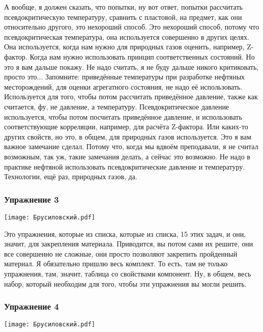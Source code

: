 \documentclass[main.tex]{subfiles}
\begin{document}
А вообще, я должен сказать, что попытки, ну вот ответ, попытки рассчитать псевдокритическую температуру, сравнить с пластовой, на предмет, как они относительно другого, это нехороший способ.
Это нехороший способ, потому что псевдокритическая температура, она используется совершенно в других целях.
Она используется, когда нам нужно для природных газов оценить, например, Z-фактор.
Когда нам нужно использовать принцип соответственных состояний.
Но это я вам дальше покажу.
Не надо считать, я не буду дальше никого критиковать, просто это...
Запомните: приведённые температуры при разработке нефтяных месторождений, для оценки агрегатного состояния, не надо её использовать.
Используется для того, чтобы потом рассчитать приведённое давление, также как считается, фу, не давление, а температуру.
Псевдокритическое давление используется, чтобы потом посчитать приведённое давление, и использовать соответствующие корреляции, например, для расчёта Z-фактора.
Или каких-то других свойств, но это, в общем, для природных газов используется.
Это я вам важное замечание сделал.
Потому что, когда мы вдвоём преподавали, я не считал возможным, так уж, такие замечания делать, а сейчас это возможно.
Не надо в практике нефтяной использовать псевдокритические давление и температуру.
Технологии, ещё раз, природных газов, да.

\subsubsection{Упражнение 3}

\begin{center}
\texttt{[image: Брусиловский.pdf]}
\end{center}

Это упражнения, которые из списка, которые из списка, 15 этих задач, и они, значит, для закрепления материала.
Приводится, вы потом сами их решите, они все совершенно не сложные, они просто позволяют закрепить пройденный материал.
Я обязательно пришлю весь комплект.
То есть, там не только упражнения, там, значит, таблица со свойствами компонент.
Ну, в общем, весь набор, который необходим для того, чтобы эти упражнения вы могли решить.

\subsubsection{Упражнение 4}

\begin{center}
\texttt{[image: Брусиловский.pdf]}
\end{center}
\end{document}
